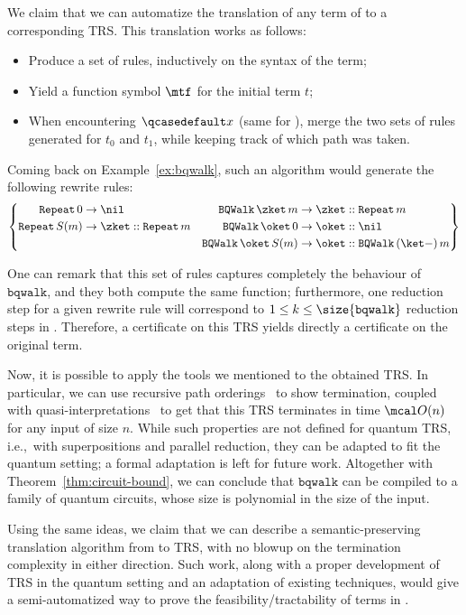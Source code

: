 We claim that we can automatize the translation of any term of \hyrql{} to a
corresponding TRS. This translation works as follows:

\begin{itemize}
  \item Produce a set of rules, inductively on the syntax of the term;
  \item Yield a function symbol $\mtf$ for the initial term $t$;
  \item When encountering $\qcasedefault x$ (same for \textmatch{}), merge the 
    two sets of rules generated for $t_0$ and $t_1$, while keeping track of
    which path was taken.
\end{itemize}

Coming back on Example~\ref{ex:bqwalk}, such an algorithm would generate the
following rewrite rules:
\[
  \left\{
    \begin{aligned}
      \mathtt{Repeat}\,0 &\to \nil   &\mathtt{BQWalk}\,\zket\,m &\to \zket ::
      \mathtt{Repeat}\,m \\
      \mathtt{Repeat}\,S(m) &\to \zket:: \mathtt{Repeat}\,m  &
      \mathtt{BQWalk}\,\oket\,0 &\to \oket :: \nil \\
      & &     \mathtt{BQWalk}\,\oket\,S(m) &\to \oket ::
      \mathtt{BQWalk}\,(\ket -)\,m
    \end{aligned}
  \right\}
\]

One can remark that this set of rules captures completely
the behaviour of $\mathtt{bqwalk}$, and they both compute the same function;
furthermore, one reduction step for a given rewrite rule will correspond to
$1 \leq k \leq \size{\mathtt{bqwalk}}$ reduction steps in \hyrql{}.
Therefore, a certificate on this TRS yields directly a certificate on the
original term. 

Now, it is possible to apply the tools we mentioned to the obtained TRS. In
particular, we can use recursive path orderings~\cite{Der82} to show
termination, coupled with quasi-interpretations~\cite{BMM11} to get that this
TRS terminates in time $\mcal O(n)$ for any input of size $n$. While such
properties are not defined for quantum TRS, i.e.,\ with superpositions and
parallel reduction, they can be adapted to fit the quantum setting; a formal
adaptation is left for future work. Altogether with
Theorem~\ref{thm:circuit-bound}, we can conclude that
$\mathtt{bqwalk}$ can be compiled to a family of quantum circuits, whose size
is polynomial in the size of the input.

Using the same ideas, we claim that we can describe a semantic-preserving
translation algorithm from \hyrql{} to TRS, with no blowup on the termination
complexity in either direction. Such work, along with a proper development of
TRS in the quantum setting and an adaptation of existing techniques, would give
a semi-automatized way to prove the feasibility/tractability of terms in
\hyrql{}.

